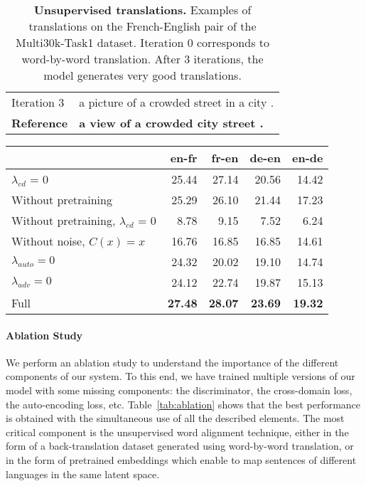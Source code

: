 \documentclass{article} \usepackage{iclr2018_conference,times}
\begin{document}
\begin{table}[bt]
\begin{center}
\begin{tabular}{ll}
    Iteration 3        & a picture of a crowded street in a city .   \\
    \textbf{Reference} & \textbf{a view of a crowded city street .}  \\
    \bottomrule
    \end{tabular}
    \smallskip
    \caption{\textbf{Unsupervised translations.} Examples of translations on the French-English pair of the Multi30k-Task1 dataset. Iteration 0 corresponds to word-by-word translation. After 3 iterations, the model generates very good translations.}
    \label{tab:examples_translation}
    \end{center}
\end{table}


\begin{table*}[t]
	\begin{center}
	\small
	\begin{tabular}[b]{lrrrr}
	\toprule
    & en-fr & fr-en & de-en & en-de \\
    \midrule
    $\lambda_{cd}$ = 0                       & 25.44 & 27.14 & 20.56 & 14.42 \\
    Without pretraining                    & 25.29 & 26.10 & 21.44 & 17.23 \\
	Without pretraining, $\lambda_{cd}$ = 0  &  8.78 &  9.15 &  7.52 &  6.24 \\
    Without noise, $C(x) = x$                          & 16.76 & 16.85 & 16.85 & 14.61 \\
	$\lambda_{auto} = 0$                   & 24.32 & 20.02 & 19.10 & 14.74 \\
    $\lambda_{adv} = 0$                    & 24.12 & 22.74 & 19.87 & 15.13 \\
    Full                                   & \textbf{27.48} & \textbf{28.07} & \textbf{23.69} & \textbf{19.32} \\
    \bottomrule
	\end{tabular}
	\caption{\textbf{Ablation study on the Multi30k-Task1 dataset}.}
	\label{tab:ablation}
	\end{center}
\end{table*}

\paragraph{Ablation Study} We perform an ablation study to understand the importance of the different components of our system. To this end, we have trained multiple versions of our model with some missing components: the discriminator, the cross-domain loss, the auto-encoding loss, etc. Table~\ref{tab:ablation} shows that the best performance is obtained with the simultaneous use of all the described elements. The most critical component is the unsupervised word alignment technique, either in the form of a back-translation dataset generated using word-by-word translation, or in the form of pretrained embeddings which enable to map sentences of different languages in the same latent space.
\end{document}
